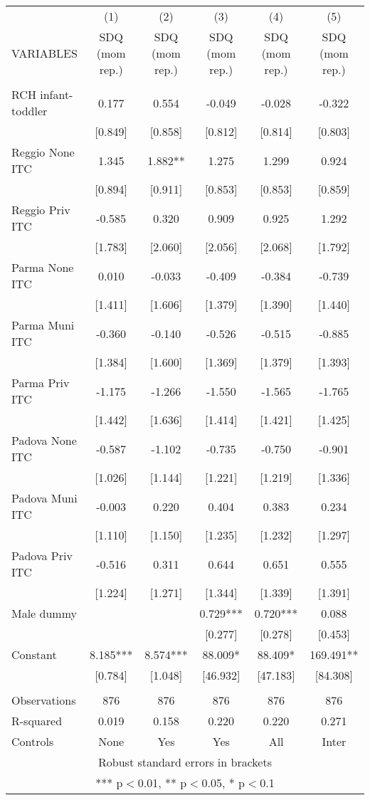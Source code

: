 \begin{tabular}{lccccc} \hline
 & (1) & (2) & (3) & (4) & (5) \\
VARIABLES & SDQ (mom rep.) & SDQ (mom rep.) & SDQ (mom rep.) & SDQ (mom rep.) & SDQ (mom rep.) \\ \hline
 &  &  &  &  &  \\
RCH infant-toddler & 0.177 & 0.554 & -0.049 & -0.028 & -0.322 \\
 & [0.849] & [0.858] & [0.812] & [0.814] & [0.803] \\
Reggio None ITC & 1.345 & 1.882** & 1.275 & 1.299 & 0.924 \\
 & [0.894] & [0.911] & [0.853] & [0.853] & [0.859] \\
Reggio Priv ITC & -0.585 & 0.320 & 0.909 & 0.925 & 1.292 \\
 & [1.783] & [2.060] & [2.056] & [2.068] & [1.792] \\
Parma None ITC & 0.010 & -0.033 & -0.409 & -0.384 & -0.739 \\
 & [1.411] & [1.606] & [1.379] & [1.390] & [1.440] \\
Parma Muni ITC & -0.360 & -0.140 & -0.526 & -0.515 & -0.885 \\
 & [1.384] & [1.600] & [1.369] & [1.379] & [1.393] \\
Parma Priv ITC & -1.175 & -1.266 & -1.550 & -1.565 & -1.765 \\
 & [1.442] & [1.636] & [1.414] & [1.421] & [1.425] \\
Padova None ITC & -0.587 & -1.102 & -0.735 & -0.750 & -0.901 \\
 & [1.026] & [1.144] & [1.221] & [1.219] & [1.336] \\
Padova Muni ITC & -0.003 & 0.220 & 0.404 & 0.383 & 0.234 \\
 & [1.110] & [1.150] & [1.235] & [1.232] & [1.297] \\
Padova Priv ITC & -0.516 & 0.311 & 0.644 & 0.651 & 0.555 \\
 & [1.224] & [1.271] & [1.344] & [1.339] & [1.391] \\
Male dummy &  &  & 0.729*** & 0.720*** & 0.088 \\
 &  &  & [0.277] & [0.278] & [0.453] \\
Constant & 8.185*** & 8.574*** & 88.009* & 88.409* & 169.491** \\
 & [0.784] & [1.048] & [46.932] & [47.183] & [84.308] \\
 &  &  &  &  &  \\
Observations & 876 & 876 & 876 & 876 & 876 \\
R-squared & 0.019 & 0.158 & 0.220 & 0.220 & 0.271 \\
 Controls & None & Yes & Yes & All & Inter \\ \hline
\multicolumn{6}{c}{ Robust standard errors in brackets} \\
\multicolumn{6}{c}{ *** p$<$0.01, ** p$<$0.05, * p$<$0.1} \\
\end{tabular}
